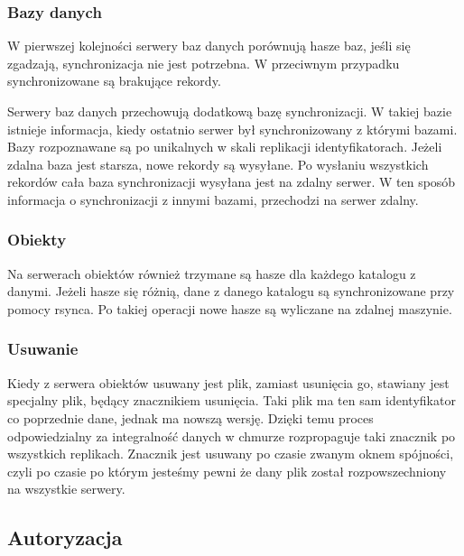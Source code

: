 \subsubsection{Bazy danych}\label{sub:bazy danych}

W pierwszej kolejności serwery baz danych porównują hasze baz, jeśli się zgadzają, synchronizacja nie jest potrzebna. W przeciwnym przypadku synchronizowane są brakujące rekordy.

Serwery baz danych przechowują dodatkową bazę synchronizacji. W takiej bazie istnieje informacja, kiedy ostatnio serwer był synchronizowany z którymi bazami. Bazy rozpoznawane są po unikalnych w skali replikacji identyfikatorach. Jeżeli zdalna baza jest starsza, nowe rekordy są wysyłane. Po wysłaniu wszystkich rekordów cała baza synchronizacji wysyłana jest na zdalny serwer. W ten sposób informacja o synchronizacji z innymi bazami, przechodzi na serwer zdalny.

\subsubsection{Obiekty}\label{sub:obiekty}

Na serwerach obiektów również trzymane są hasze dla każdego katalogu z danymi. Jeżeli hasze się różnią, dane z danego katalogu są synchronizowane przy pomocy rsynca. Po takiej operacji nowe hasze są wyliczane na zdalnej maszynie.

\subsubsection{Usuwanie}\label{sub:usuwanie}

Kiedy z serwera obiektów usuwany jest plik, zamiast usunięcia go, stawiany jest specjalny plik, będący znacznikiem usunięcia. Taki plik ma ten sam identyfikator co poprzednie dane, jednak ma nowszą wersję. Dzięki temu proces odpowiedzialny za integralność danych w chmurze rozpropaguje taki znacznik po wszystkich replikach. Znacznik jest usuwany po czasie zwanym oknem spójności, czyli po czasie po którym jesteśmy pewni że dany plik został rozpowszechniony na wszystkie serwery.

\subsection{Autoryzacja}\label{sec:autoryzacja}

